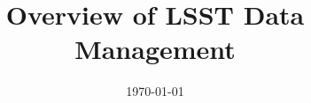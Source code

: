 \documentclass[modern]{aastex62}
\begin{document}

\date{\today}
\title{Overview of LSST Data Management}





\label{sec:bib}

\end{document}
